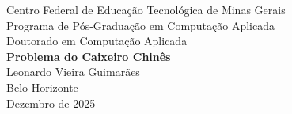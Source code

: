 \documentclass[12pt]{article}
\begin{document}
\onehalfspacing
\begin{titlepage}
    \centering
    \vspace*{2cm}
    {\Large Centro Federal de Educação Tecnológica de Minas Gerais}\\[0.7cm]
    {\large Programa de Pós-Graduação em Computação Aplicada}\\[0.5cm]
    {\large Doutorado em Computação Aplicada}\\[2.5cm]
    {\LARGE \textbf{Problema do Caixeiro Chinês}}\\[2.5cm]
    {\large Leonardo Vieira Guimarães}\\[5.5cm]
    {\large Belo Horizonte}\\[0.3cm]
    {\large Dezembro de 2025}
    \vspace*{2cm}
\end{titlepage}
\setcounter{page}{1}
\end{document}
